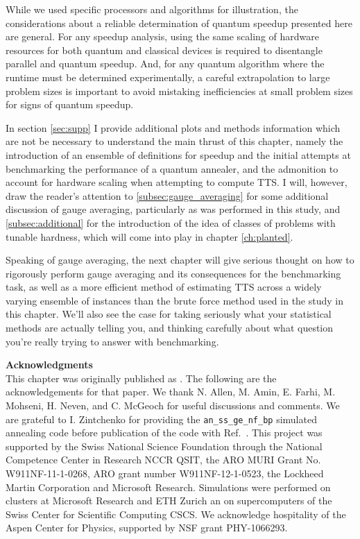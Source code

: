While we used specific processors and algorithms for illustration, the considerations about a reliable determination of quantum speedup presented here are general. For any speedup analysis, using the same scaling of hardware resources for both quantum and classical devices is required to disentangle parallel and quantum speedup. And, for any quantum algorithm where the runtime must be determined experimentally, a careful extrapolation to large problem sizes is important to avoid mistaking inefficiencies at small problem sizes for signs of quantum speedup.

In section \ref{sec:supp} I provide additional plots and methods information which are not be necessary to understand the main thrust of this chapter, namely the introduction of an ensemble of definitions for speedup and the initial attempts at benchmarking the performance of a quantum annealer, and the admonition to account for hardware scaling when attempting to compute TTS. I will, however, draw the reader's attention to \ref{subsec:gauge_averaging} for some additional discussion of gauge averaging, particularly as was performed in this study, and \ref{subsec:additional} for the introduction of the idea of classes of problems with tunable hardness, which will come into play in chapter \ref{ch:planted}.

Speaking of gauge averaging, the next chapter will give serious thought on how to rigorously perform gauge averaging and its consequences for the benchmarking task, as well as a more efficient method of estimating TTS across a widely varying ensemble of instances than the brute force method used in the study in this chapter. We'll also see the case for taking seriously what your statistical methods are actually telling you, and thinking carefully about what question you're really trying to answer with benchmarking.







{\small \noindent \textbf{Acknowledgments}\\
This chapter was originally published as \cite{speedup}. The following are the acknowledgements for that paper.
\noindent We thank N. Allen, M. Amin, E. Farhi, M. Mohseni, H. Neven, and C. McGeoch for useful discussions and comments. We are grateful to I. Zintchenko for providing  the  {\tt an\_ss\_ge\_nf\_bp} simulated annealing code before publication of the code with Ref.~\cite{sapaper}.
This project was supported by the Swiss National Science Foundation through the National Competence Center in Research NCCR QSIT, the ARO MURI Grant No. W911NF-11-1-0268, ARO grant number W911NF-12-1-0523, the Lockheed Martin Corporation and Microsoft Research. Simulations were performed on clusters at Microsoft Research and ETH Zurich an on supercomputers of the Swiss Center for Scientific Computing CSCS. We acknowledge hospitality of the Aspen Center for Physics, supported by NSF grant PHY-1066293.}
\\ \\

